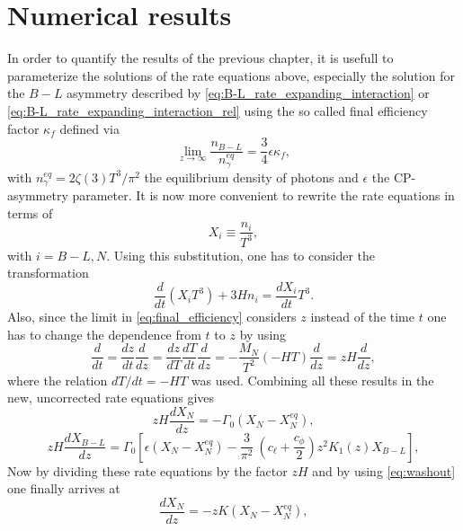 \chapter{Numerical results} \label{sec:num_results}
In order to quantify the results of the previous chapter, it is usefull to parameterize the solutions of the rate equations above, especially the solution for the $B-L$ asymmetry described by \eqref{eq:B-L_rate_expanding_interaction} or \eqref{eq:B-L_rate_expanding_interaction_rel} using the so called final efficiency factor $\kappa_f$ defined via
\begin{equation}
\lim\limits_{z\rightarrow\infty}\frac{n_{B-L}}{n_\gamma^{eq}}=\frac{3}{4}\epsilon\kappa_f,
\label{eq:final_efficiency}
\end{equation}
with $n_\gamma^{eq}=2\zeta(3)T^3/\pi^2$ the equilibrium density of photons and $\epsilon$ the CP-asymmetry parameter. It is now more convenient to rewrite the rate equations in terms of
\begin{equation}
	X_i\equiv\frac{n_i}{T^3},
	\label{eq:X_i}
\end{equation}
 with $i=B-L,N$. Using this substitution, one has to consider the transformation \cite[Eq. 7.1]{Wormann:2016yyi}
\begin{equation}
\frac{d}{dt}(X_iT^3)+3Hn_i=\frac{dX_i}{dt}T^3.
\end{equation}
Also, since the limit in \eqref{eq:final_efficiency} considers $z$ instead of the time $t$ one has to change the dependence from $t$ to $z$ by using
\begin{equation}
\frac{d}{dt}=\frac{dz}{dt}\frac{d}{dz}=\frac{dz}{dT}\frac{dT}{dt}\frac{d}{dz}=-\frac{M_N}{T^2}(-HT)\frac{d}{dz}=zH\frac{d}{dz},
\end{equation}
where the relation $dT/dt=-HT$ \cite[p. 3]{HahnWoernle:2009qn} was used. \newline\indent
Combining all these results in the new, uncorrected rate equations gives
\begin{equation*}
zH\frac{dX_N}{dz}=-\Gamma_0\left(X_N-X_N^{eq}\right),
\end{equation*}
\begin{equation*}
zH\frac{dX_{B-L}}{dz}=\Gamma_0\left[\epsilon\left(X_N-X_N^{eq}\right)-\frac{3}{\pi^2}\:\left(c_\ell+\frac{c_\phi}{2}\right)z^2K_1(z)X_{B-L}\right],
\end{equation*}
Now by dividing these rate equations by the factor $zH$ and by using \eqref{eq:washout} one finally arrives at
\begin{equation}
\frac{dX_N}{dz}=-zK\left(X_N-X_N^{eq}\right),
\end{equation}
